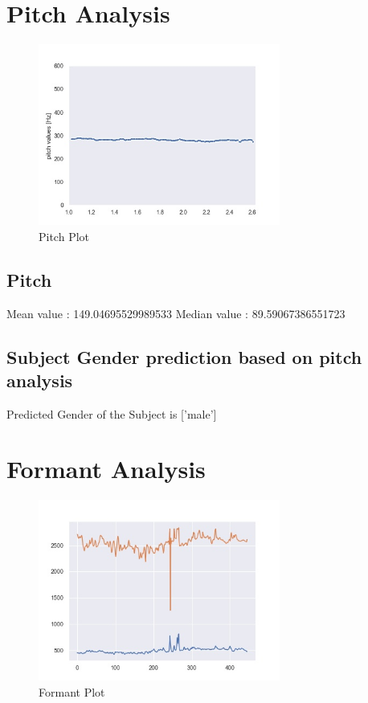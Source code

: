 \documentclass{article}%
\begin{document}
%
\pagebreak[4]

%
\section{Pitch Analysis}%
\label{sec:PitchAnalysis}%


\begin{figure}[h!]%
\centering%
\includegraphics[width=300px]{pitch.jpg}%
\caption{Pitch Plot}%
\end{figure}

%
\subsection{Pitch}%
\label{subsec:Pitch}%
Mean value : 149.04695529989533%
\newline%
Median value : 89.59067386551723

%
\subsection{Subject Gender prediction based on pitch analysis}%
\label{subsec:SubjectGenderpredictionbasedonpitchanalysis}%
Predicted Gender of the Subject is {[}'male'{]}

%
\pagebreak[4]

%
\section{Formant Analysis}%
\label{sec:FormantAnalysis}%


\begin{figure}[h!]%
\centering%
\includegraphics[width=300px]{formant.jpg}%
\caption{Formant Plot}%
\end{figure}
\end{document}
